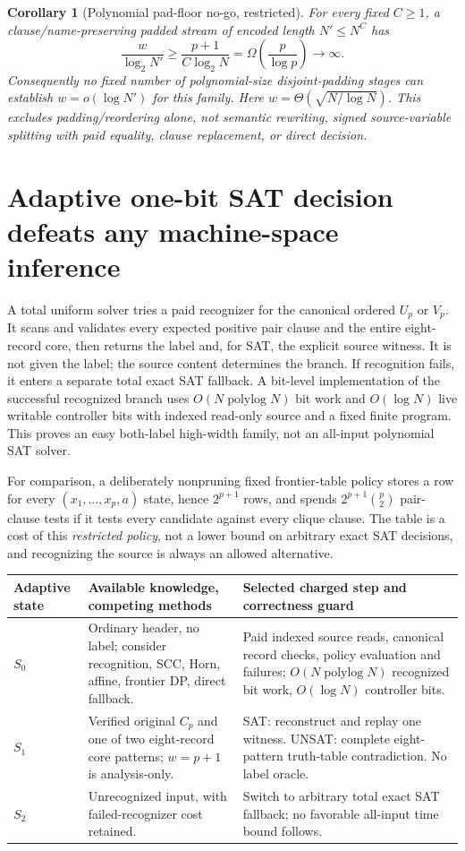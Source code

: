 \documentclass[11pt]{article}
\newtheorem{corollary}[theorem]{Corollary}
\begin{document}
\begin{corollary}[Polynomial pad-floor no-go, restricted]
For every fixed $C\ge1$, a clause/name-preserving padded stream of encoded length $N'\le N^C$ has
\[
 \frac{w}{\log_2 N'}\ge\frac{p+1}{C\log_2 N}
 =\Omega\left(\frac p{\log p}\right)\longrightarrow\infty.
\]
Consequently no fixed number of polynomial-size disjoint-padding stages can establish $w=o(\log N')$ for this family. Here $w=\Theta(\sqrt{N/\log N})$. This excludes padding/reordering alone, not semantic rewriting, signed source-variable splitting with paid equality, clause replacement, or direct decision.
\end{corollary}

\section{Adaptive one-bit SAT decision defeats any machine-space inference}
A total uniform solver tries a paid recognizer for the canonical ordered $U_p$ or $V_p$. It scans and validates every expected positive pair clause and the entire eight-record core, then returns the label and, for SAT, the explicit source witness. It is not given the label; the source content determines the branch. If recognition fails, it enters a separate total exact SAT fallback. A bit-level implementation of the successful recognized branch uses $O(N\operatorname{polylog}N)$ bit work and $O(\log N)$ live writable controller bits with indexed read-only source and a fixed finite program. This proves an easy both-label high-width family, not an all-input polynomial SAT solver.

For comparison, a deliberately nonpruning fixed frontier-table policy stores a row for every $(x_1,\ldots,x_p,a)$ state, hence $2^{p+1}$ rows, and spends $2^{p+1}\binom p2$ pair-clause tests if it tests every candidate against every clique clause. The table is a cost of this \emph{restricted policy}, not a lower bound on arbitrary exact SAT decisions, and recognizing the source is always an allowed alternative.

\begin{center}\small
\begin{tabular}{p{.15\linewidth}p{.28\linewidth}p{.45\linewidth}}
\toprule
Adaptive state & Available knowledge, competing methods & Selected charged step and correctness guard\\
\midrule
$S_0$ & Ordinary header, no label; consider recognition, SCC, Horn, affine, frontier DP, direct fallback. & Paid indexed source reads, canonical record checks, policy evaluation and failures; $O(N\operatorname{polylog}N)$ recognized bit work, $O(\log N)$ controller bits.\\
$S_1$ & Verified original $C_p$ and one of two eight-record core patterns; $w=p+1$ is analysis-only. & SAT: reconstruct and replay one witness. UNSAT: complete eight-pattern truth-table contradiction. No label oracle.\\
$S_2$ & Unrecognized input, with failed-recognizer cost retained. & Switch to arbitrary total exact SAT fallback; no favorable all-input time bound follows.\\
\bottomrule
\end{tabular}
\end{center}
\end{document}
